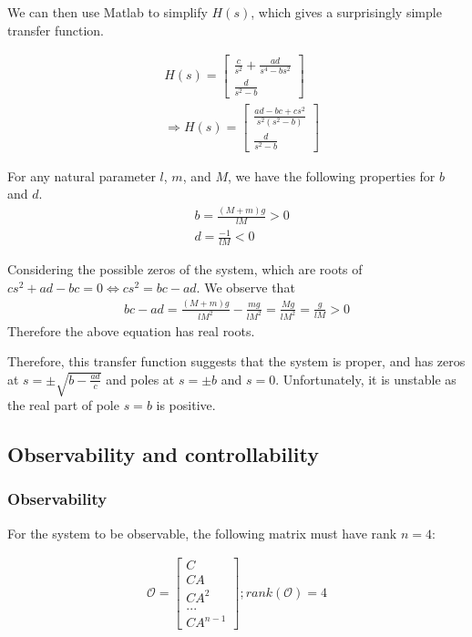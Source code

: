 \documentclass [12pt,letterpaper]{exam}
\begin{document}
We can then use Matlab to simplify $H(s)$, which gives a surprisingly simple transfer function.

\begin{align}
& H(s) = \begin{bmatrix} 
\frac{c}{s^2} + \frac{ad}{s^4 - bs^2} \\
\frac{d}{s^2 - b}
\end{bmatrix} \\
& \Rightarrow H(s) =\begin{bmatrix} 
\frac{ad - bc + cs^2}{s^2 (s^2 - b)} \\
\frac{d}{s^2 - b}
\end{bmatrix}
\end{align}

For any natural parameter $l$, $m$, and $M$, we have the following properties for $b$ and $d$.
\begin{align}
& b = \frac{(M + m)g}{lM} > 0 \\
& d = \frac{-1}{lM} < 0
\end{align}

Considering the possible zeros of the system, which are roots of $cs^2 + ad - bc = 0 \Leftrightarrow cs^2 = bc - ad$. We observe that 
\begin{align}
bc - ad = \frac{(M + m)g}{lM^2} - \frac{mg}{lM^2} = \frac{Mg}{lM^2} = \frac{g}{lM} > 0
\end{align}
Therefore the above equation has real roots.

Therefore, this transfer function suggests that the system is proper, and has zeros at $s = \pm\sqrt{b - \frac{ad}{c}}$ and poles at $s = \pm b$ and $s = 0$. Unfortunately, it is unstable as the real part of pole $s = b$ is positive.

\subsection{Observability and controllability}
\subsubsection{Observability}

For the system to be observable, the following matrix must have rank $n = 4$:

\begin{align}
\mathcal{O} =
\begin{bmatrix}
C \\
CA \\
CA^2 \\
... \\
CA^{n-1}
\end{bmatrix} ; rank(\mathcal{O}) = 4
\end{align}
\end{document}
